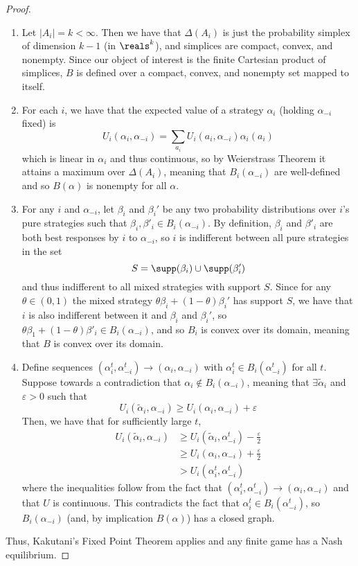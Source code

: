 \documentclass[10pt]{article}
\begin{document}
\begin{proof}
	\begin{enumerate}
		\item Let $|A_i| = k < \infty$. Then we have that $\Delta(A_i)$ is just the probability simplex of dimension $k-1$ (in $\reals^k$), and simplices are compact, convex, and nonempty. Since our object of interest is the finite Cartesian product of simplices, $B$ is defined over a compact, convex, and nonempty set mapped to itself. 
		\item For each $i$, we have that the expected value of a strategy $\alpha_i$ (holding $\alpha_{-i}$ fixed) is \[U_i(\alpha_i,\alpha_{-i}) = \sum_{a_i}U_i(a_i,\alpha_{-i})\alpha_i(a_i)\]which is linear in $\alpha_i$ and thus continuous, so by Weierstrass Theorem it attains a maximum over $\Delta(A_i)$, meaning that $B_i(\alpha_{-i})$ are well-defined and so $B(\alpha)$ is nonempty for all $\alpha$.
		\item For any $i$ and $\alpha_{-i}$, let $\beta_i$ and $\beta_i'$ be any two probability distributions over $i$'s pure strategies such that $\beta_i,\beta'_i \in B_i(\alpha_{-i})$. By definition, $\beta_i$ and $\beta'_i$ are both best responses by $i$ to $\alpha_{-i}$, so $i$ is indifferent between all pure strategies in the set \[S = \supp(\beta_i) \cup \supp(\beta'_i)\]and thus indifferent to all mixed strategies with support $S$. Since for any $\theta \in (0,1)$ the mixed strategy $\theta \beta_i + (1-\theta) \beta_i'$ has support $S$, we have that $i$ is also indifferent between it and $\beta_i$ and $\beta_i'$, so $\theta\beta_1 + (1-\theta)\beta'_i \in B_i(\alpha_{-i})$, and so $B_i$ is convex over its domain, meaning that $B$ is convex over its domain.
		\item Define sequences $(\alpha_i^t,\alpha_{-i}^t) \to (\alpha_i,\alpha_{-i})$ with $\alpha^t_i \in B_i(\alpha_{-i}^t)$ for all $t$. Suppose towards a contradiction that $\alpha_i \not\in B_i(\alpha_{-i})$, meaning that $\exists \tilde{\alpha}_i$ and $\varepsilon > 0$ such that\[U_i(\tilde{\alpha}_i,\alpha_{-i}) \ge U_i(\alpha_i,\alpha_{-i})+\varepsilon\]Then, we have that for sufficiently large $t$, \begin{align*} U_i(\tilde{\alpha}_i,\alpha_{-i}) &\ge U_i(\tilde{\alpha}_i,\alpha^t_{-i}) - \frac{\varepsilon}{2} \\ &\ge U_i(\alpha_i,\alpha_{-i}) + \frac{\varepsilon}{2} \\ &> U_i(\alpha_i^t,\alpha_{-i}^t)	\end{align*} where the inequalities follow from the fact that $(\alpha_i^t,\alpha_{-i}^t) \to (\alpha_i,\alpha_{-i})$ and that $U$ is continuous. This contradicts the fact that $\alpha_i^t \in B_i(\alpha_{-i}^t)$, so $B_i(\alpha_{-i})$ (and, by implication $B(\alpha)$) has a closed graph.
	\end{enumerate}
	Thus, Kakutani's Fixed Point Theorem applies and any finite game has a Nash equilibrium.
\end{proof}
\end{document}
